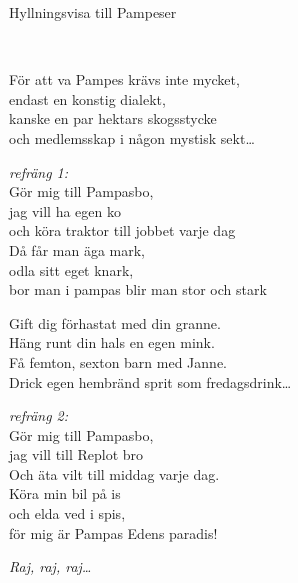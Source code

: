 \begin{song}{Hyllningsvisa till Pampeser}
	
	
	\\
	
	
	För att va Pampes krävs inte mycket,\\
	endast en konstig dialekt,\\
	kanske en par hektars skogsstycke\\
	och medlemsskap i någon mystisk sekt\dots

	
	\emph{refräng 1:}\\
	Gör mig till Pampasbo,\\
	jag vill ha egen ko\\
	och köra traktor till jobbet varje dag\\
	Då får man äga mark,\\
	odla sitt eget knark,\\
	bor man i pampas blir man stor och stark

	Gift dig förhastat med din granne.\\
	Häng runt din hals en egen mink.\\
	Få femton, sexton barn med Janne.\\
	Drick egen hembränd sprit som fredagsdrink\dots

	\emph{refräng 2:}\\
	Gör mig till Pampasbo,\\
	jag vill till Replot bro\\
	Och äta vilt till middag varje dag.\\
	Köra min bil på is\\
	och elda ved i spis,\\
	för mig är Pampas Edens paradis!

	\emph{Raj, raj, raj\ldots}
	
\end{song}
